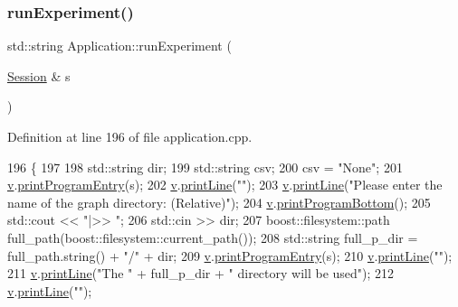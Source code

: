 \subsubsection{\texorpdfstring{run\+Experiment()}{runExperiment()}}
{\footnotesize\ttfamily std\+::string Application\+::run\+Experiment (\begin{DoxyParamCaption}\item[{\hyperlink{struct_session}{Session} \&}]{s }\end{DoxyParamCaption})}



Definition at line 196 of file application.\+cpp.


\begin{DoxyCode}
196                                               \{
197     
198     std::string dir;
199     std::string csv;
200     csv = \textcolor{stringliteral}{"None"};
201     \hyperlink{class_application_a96cff2295a95d7e6de06638bb7e61243}{v}.\hyperlink{class_visualize_a29f27ff8c5e59163eea2be42ff372405}{printProgramEntry}(s);
202     \hyperlink{class_application_a96cff2295a95d7e6de06638bb7e61243}{v}.\hyperlink{class_visualize_abce6cd538dc0715b21851e0bf0377d85}{printLine}(\textcolor{stringliteral}{""});
203     \hyperlink{class_application_a96cff2295a95d7e6de06638bb7e61243}{v}.\hyperlink{class_visualize_abce6cd538dc0715b21851e0bf0377d85}{printLine}(\textcolor{stringliteral}{"Please enter the name of the graph directory: (Relative)"});
204     \hyperlink{class_application_a96cff2295a95d7e6de06638bb7e61243}{v}.\hyperlink{class_visualize_ac0be9ece2d80a7d1e34724fb87424216}{printProgramBottom}();
205     std::cout << \textcolor{stringliteral}{"|>> "};
206     std::cin >> dir;
207     boost::filesystem::path full\_path(boost::filesystem::current\_path());
208     std::string full\_p\_dir = full\_path.string() + \textcolor{stringliteral}{"/"} + dir;
209     \hyperlink{class_application_a96cff2295a95d7e6de06638bb7e61243}{v}.\hyperlink{class_visualize_a29f27ff8c5e59163eea2be42ff372405}{printProgramEntry}(s);
210     \hyperlink{class_application_a96cff2295a95d7e6de06638bb7e61243}{v}.\hyperlink{class_visualize_abce6cd538dc0715b21851e0bf0377d85}{printLine}(\textcolor{stringliteral}{""});
211     \hyperlink{class_application_a96cff2295a95d7e6de06638bb7e61243}{v}.\hyperlink{class_visualize_abce6cd538dc0715b21851e0bf0377d85}{printLine}(\textcolor{stringliteral}{"The "} + full\_p\_dir + \textcolor{stringliteral}{" directory will be used"});
212     \hyperlink{class_application_a96cff2295a95d7e6de06638bb7e61243}{v}.\hyperlink{class_visualize_abce6cd538dc0715b21851e0bf0377d85}{printLine}(\textcolor{stringliteral}{""});

\end{DoxyCode}
